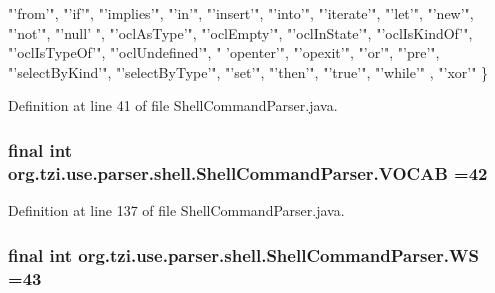 \begin{DoxyCode}
{      "'from'"}, \textcolor{stringliteral}{"'if'"}, \textcolor{stringliteral}{"'implies'"}, \textcolor{stringliteral}{"'in'"}, \textcolor{stringliteral}{"'insert'"}, \textcolor{stringliteral}{"'into'"}, \textcolor{stringliteral}{"'iterate'"}, \textcolor{stringliteral}{"'let'"}, \textcolor{stringliteral}{"'new'"}, \textcolor{stringliteral}{"'not'"}, \textcolor{stringliteral}{"'null'
      "}, \textcolor{stringliteral}{"'oclAsType'"}, \textcolor{stringliteral}{"'oclEmpty'"}, \textcolor{stringliteral}{"'oclInState'"}, \textcolor{stringliteral}{"'oclIsKindOf'"}, \textcolor{stringliteral}{"'oclIsTypeOf'"}, \textcolor{stringliteral}{"'oclUndefined'"}, \textcolor{stringliteral}{"
      'openter'"}, \textcolor{stringliteral}{"'opexit'"}, \textcolor{stringliteral}{"'or'"}, \textcolor{stringliteral}{"'pre'"}, \textcolor{stringliteral}{"'selectByKind'"}, \textcolor{stringliteral}{"'selectByType'"}, \textcolor{stringliteral}{"'set'"}, \textcolor{stringliteral}{"'then'"}, \textcolor{stringliteral}{"'true'"}, \textcolor{stringliteral}{"'while'"}
      , \textcolor{stringliteral}{"'xor'"}
    \}
\end{DoxyCode}


Definition at line 41 of file Shell\-Command\-Parser.\-java.

\hypertarget{classorg_1_1tzi_1_1use_1_1parser_1_1shell_1_1_shell_command_parser_a9ed513409bb5891111a4e8a40efe9fd0}{
\subsubsection[{V\-O\-C\-A\-B}]{\setlength{\rightskip}{0pt plus 5cm}final int org.\-tzi.\-use.\-parser.\-shell.\-Shell\-Command\-Parser.\-V\-O\-C\-A\-B =42\hspace{0.3cm}{\ttfamily [static]}}}\label{classorg_1_1tzi_1_1use_1_1parser_1_1shell_1_1_shell_command_parser_a9ed513409bb5891111a4e8a40efe9fd0}


Definition at line 137 of file Shell\-Command\-Parser.\-java.

\hypertarget{classorg_1_1tzi_1_1use_1_1parser_1_1shell_1_1_shell_command_parser_ad1eb7f196e278698295abb130df5dfbe}{
\subsubsection[{W\-S}]{\setlength{\rightskip}{0pt plus 5cm}final int org.\-tzi.\-use.\-parser.\-shell.\-Shell\-Command\-Parser.\-W\-S =43\hspace{0.3cm}{\ttfamily [static]}}}\label{classorg_1_1tzi_1_1use_1_1parser_1_1shell_1_1_shell_command_parser_ad1eb7f196e278698295abb130df5dfbe}


